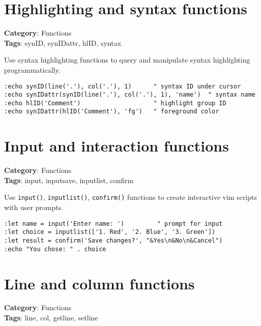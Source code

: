 {\section{Highlighting and syntax functions}

\textbf{Category}: Functions\\ \textbf{Tags}: synID, synIDattr, hlID, syntax
\vspace{0.5cm}

Use syntax highlighting functions to query and manipulate syntax highlighting programmatically.

\begin{Exa*}{}
\begin{Verbatim}[fontsize=\footnotesize, breaklines, breakanywhere]
:echo synID(line('.'), col('.'), 1)      " syntax ID under cursor
:echo synIDattr(synID(line('.'), col('.'), 1), 'name')  " syntax name
:echo hlID('Comment')                    " highlight group ID
:echo synIDattr(hlID('Comment'), 'fg')   " foreground color
\end{Verbatim}
\end{Exa*}

\section{Input and interaction functions}

\textbf{Category}: Functions\\ \textbf{Tags}: input, inputsave, inputlist, confirm
\vspace{0.5cm}

Use {\footnotesize \Verb§input()§}, {\footnotesize \Verb§inputlist()§}, {\footnotesize \Verb§confirm()§} functions to create interactive vim scripts with user prompts.

\begin{Exa*}{}
\begin{Verbatim}[fontsize=\footnotesize, breaklines, breakanywhere]
:let name = input('Enter name: ')         " prompt for input
:let choice = inputlist(['1. Red', '2. Blue', '3. Green'])
:let result = confirm('Save changes?', "&Yes\n&No\n&Cancel")
:echo "You chose: " . choice
\end{Verbatim}
\end{Exa*}

\section{Line and column functions}

\textbf{Category}: Functions\\ \textbf{Tags}: line, col, getline, setline
\vspace{0.5cm}

}
